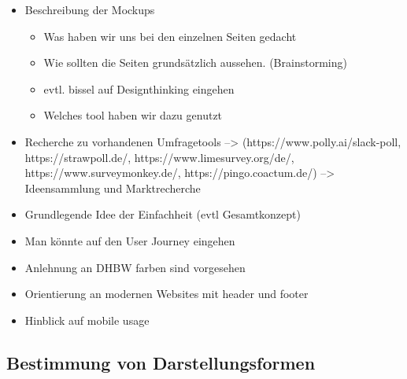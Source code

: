 \begin{itemize}
	\item Beschreibung der Mockups 
	 \begin{itemize}
		 \item Was haben wir uns bei den einzelnen Seiten gedacht
		 \item Wie sollten die Seiten grundsätzlich aussehen. (Brainstorming)
		 \item evtl. bissel auf Designthinking eingehen
		 \item Welches tool haben wir dazu genutzt
	 \end{itemize}
	 \item Recherche zu vorhandenen Umfragetools --> (https://www.polly.ai/slack-poll, https://strawpoll.de/, https://www.limesurvey.org/de/, https://www.surveymonkey.de/, https://pingo.coactum.de/)
	 --> Ideensammlung und Marktrecherche
	 \item Grundlegende Idee der Einfachheit (evtl Gesamtkonzept)
	 \item Man könnte auf den User Journey eingehen
	 \item Anlehnung an DHBW farben sind vorgesehen
	 \item Orientierung an modernen Websites mit header und footer
	 \item Hinblick auf mobile usage
\end{itemize}
\subsection{Bestimmung von Darstellungsformen}